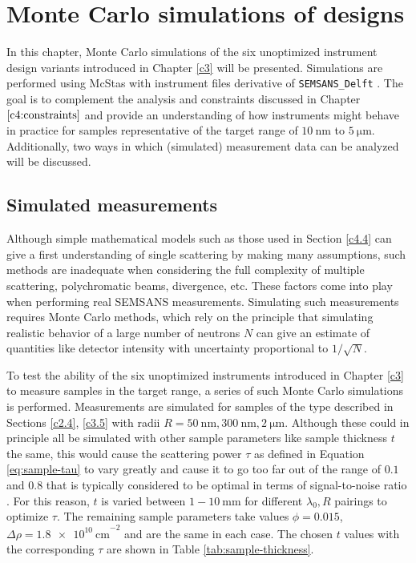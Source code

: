 \chapter{Monte Carlo simulations of designs}
\label{chapter:optimization}
\label{c6:monte-carlo}
In this chapter, Monte Carlo simulations of the six unoptimized instrument design variants introduced in Chapter \ref{c3} will be presented. Simulations are performed using McStas \cite{willendrup2020} with instrument files derivative of \texttt{SEMSANS\_Delft} \cite{bouwman2021b}. The goal is to complement the analysis and constraints discussed in Chapter $\ref{c4:constraints}$ and provide an understanding of how instruments might behave in practice for samples representative of the target range of $\SI{10}{\nano\meter}$ to $\SI{5}{\micro\meter}$. Additionally, two ways in which (simulated) measurement data can be analyzed will be discussed. 
\section{Simulated measurements}
Although simple mathematical models such as those used in Section \ref{c4.4} can give a first understanding of single scattering by making many assumptions, such methods are inadequate when considering the full complexity of multiple scattering, polychromatic beams, divergence, etc. These factors come into play when performing real SEMSANS measurements. Simulating such measurements requires Monte Carlo methods, which rely on the principle that simulating realistic behavior of a large number of neutrons $N$ can give an estimate of quantities like detector intensity with uncertainty proportional to $1/\sqrt{N}$.  

To test the ability of the six unoptimized instruments introduced in Chapter \ref{c3} to measure samples in the target range, a series of such Monte Carlo simulations is performed. Measurements are simulated for samples of the type described in Sections \ref{c2.4}, \ref{c3.5} with radii $R = \SI{50}{\nano\meter}, \SI{300}{\nano\meter}, \SI{2}{\micro\meter}$. Although these could in principle all be simulated with other sample parameters like sample thickness $t$ the same, this would cause the scattering power $\tau$ as defined in Equation \eqref{eq:sample-tau} to vary greatly and cause it to go too far out of the range of $0.1$ and $0.8$ that is typically considered to be optimal in terms of signal-to-noise ratio \cite{bouwman2021b}\cite{heijkamp2011}. For this reason, $t$ is varied between $1 - 10 ~\unit{\milli\meter}$ for different $\lambda_0, R$ pairings to optimize $\tau$. The remaining sample parameters take values $\phi = 0.015$, $\Delta\rho = \SI{1.8e10}{\centi\meter}^{-2}$ and are the same in each case. The chosen $t$ values with the corresponding $\tau$ are shown in Table \ref{tab:sample-thickness}.

